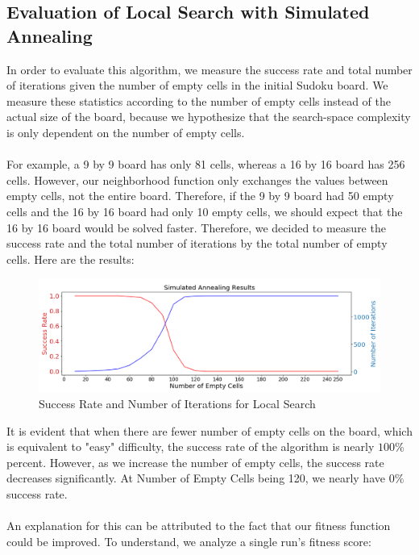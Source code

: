 \documentclass[12pt, a4paper]{article}
\begin{document}
		\subsection{Evaluation of Local Search with Simulated Annealing}
			In order to evaluate this algorithm, we measure the success rate and total number of iterations given the number of empty cells in the initial Sudoku board. We measure these statistics according to the number of empty cells instead of the actual size of the board, because we hypothesize that the search-space complexity is only dependent on the number of empty cells.\\\\
			For example, a 9 by 9 board has only 81 cells, whereas a 16 by 16 board has 256 cells. However, our neighborhood function only exchanges the values between empty cells, not the entire board. Therefore, if the 9 by 9 board had 50 empty cells and the 16 by 16 board had only 10 empty cells, we should expect that the 16 by 16 board would be solved faster. Therefore, we decided to measure the success rate and the total number of iterations by the total number of empty cells. Here are the results:
			\begin{figure}[h]
			\begin{center} 
				\includegraphics[width=7in]{simulated_annealing_results.png}
				\caption{Success Rate and Number of Iterations for Local Search} 
			\end{center} 
			\end{figure}
			It is evident that when there are fewer number of empty cells on the board, which is equivalent to "easy" difficulty, the success rate of the algorithm is nearly $100$\% percent. However, as we increase the number of empty cells, the success rate decreases significantly. At Number of Empty Cells being 120, we nearly have $0\%$ success rate.\\\\
			An explanation for this can be attributed to the fact that our fitness function could be improved. To understand, we analyze a single run's fitness score:
\end{document}
